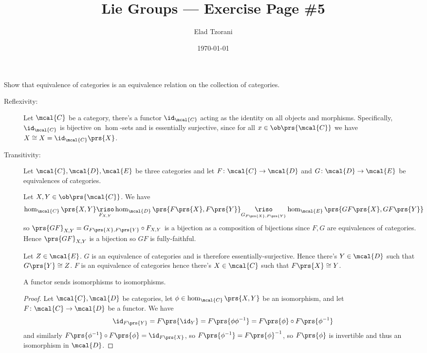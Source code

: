 \documentclass[10pt]{article}
\title{Lie Groups --- Exercise Page \#5}
\author{Elad Tzorani}
\date{\today}
\begin{document}
\maketitle

\setcounter{section}{1}

\begin{exercise}%
Show that equivalence of categories is an equivalence relation on the collection of categories.
\end{exercise}

\begin{solution}%
\begin{description}
\item[Reflexivity:]
Let $\mcal{C}$ be a category, there's a functor $\id_{\mcal{C}}$ acting as the identity on all objects and morphisms.
Specifically, $\id_{\mcal{C}}$ is bijective on $\hom$-sets and is essentially surjective, since for all $x \in \ob\prs{\mcal{C}}$ we have $X \cong X = \id_{\mcal{C}}\prs{X}$.
\item[Transitivity:]
Let $\mcal{C}, \mcal{D}, \mcal{E}$ be three categories and let $F \colon \mcal{C} \to \mcal{D}$ and $G \colon \mcal{D} \to \mcal{E}$ be equivalences of categories.

Let $X,Y \in \ob\prs{\mcal{C}}$.
We have
\begin{align*}
\hom_{\mcal{C}}\prs{X,Y} \underset{F_{X,Y}}{\riso} \hom_{\mcal{D}}\prs{F\prs{X}, F\prs{Y}} \underset{G_{F\prs{X}, F\prs{Y}}}{\riso} \hom_{\mcal{E}}\prs{GF\prs{X}, GF\prs{Y}}
\end{align*}
so $\prs{GF}_{X,Y} = G_{F\prs{X},F\prs{Y}} \circ F_{X,Y}$ is a bijection as a composition of bijections since $F,G$ are equivalences of categories. Hence $\prs{GF}_{X,Y}$ is a bijection so $GF$ is fully-faithful.

Let $Z \in \mcal{E}$. $G$ is an equivalence of categories and is therefore essentially-surjective. Hence there's $Y \in \mcal{D}$ such that $G\prs{Y} \cong Z$. $F$ is an equivalence of categories hence there's $X \in \mcal{C}$ such that $F\prs{X} \cong Y$.

\begin{lemma}
A functor sends isomorphisms to isomorphisms.
\end{lemma}
\begin{proof}
Let $\mcal{C},\mcal{D}$ be categories, let $\phi \in \hom_{\mcal{C}}\prs{X,Y}$ be an isomorphism, and let $F \colon \mcal{C} \to \mcal{D}$ be a functor.
We have
\[\id_{F\prs{Y}} = F\prs{\id_{Y}} = F\prs{\phi \phi^{-1}} = F\prs{\phi} \circ F\prs{\phi^{-1}}\]
and similarly $F\prs{\phi^{-1}} \circ F\prs{\phi} = \id_{F\prs{X}}$, so $F\prs{\phi^{-1}} = F\prs{\phi}^{-1}$, so $F\prs{\phi}$ is invertible and thus an isomorphism in $\mcal{D}$.
\end{proof}


\end{description}
\end{solution}
\end{document}
